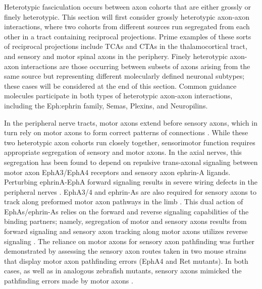 \label{sec:HeterotypicFascic}
Heterotypic fasciculation occurs between axon cohorts that are either grossly or finely heterotypic.
This section will first consider grossly heterotypic axon-axon interactions, where two cohorts from different sources run segregated from each other in a tract containing reciprocal projections.
Prime examples of these sorts of reciprocal projections include TCAs and CTAs in the thalamocortical tract, and sensory and motor spinal axons in the periphery.
Finely heterotypic axon-axon interactions are those occurring between subsets of axons arising from the same source but representing different molecularly defined neuronal subtypes; these cases will be considered at the end of this section.
Common guidance molecules participate in both types of heterotypic axon-axon interactions, including the Eph:ephrin family, Semas, Plexins, and Neuropilins. 

In the peripheral nerve tracts, motor axons extend before sensory axons, which in turn rely on motor axons to form correct patterns of connections \cite{wang2013axons}.
While these two heterotypic axon cohorts run closely together, sensorimotor function requires appropriate segregation of sensory and motor axons.
In the axial nerves, this segregation has been found to depend on repulsive trans-axonal signaling between motor axon EphA3/EphA4 receptors and sensory axon ephrin-A ligands.
Perturbing ephrinA-EphA forward signaling results in severe wiring defects in the peripheral nerves \cite{gallarda2008segregation}.
EphA3/4 and ephrin-As are also required for sensory axons to track along preformed motor axon pathways in the limb \cite{wang2011anatomical}.
This dual action of EphAs/ephrin-As relies on the forward and reverse signaling capabilities of the binding partners; namely, segregation of motor and sensory axons results from forward signaling and sensory axon tracking along motor axons utilizes reverse signaling \cite{wang2011anatomical}.
The reliance on motor axons for sensory axon pathfinding was further demonstrated by assessing the sensory axon routes taken in two mouse strains that display motor axon pathfinding errors (EphA4 and Ret mutants).
In both cases, as well as in analogous zebrafish mutants, sensory axons mimicked the pathfinding errors made by motor axons \cite{wang2014conserved}.

